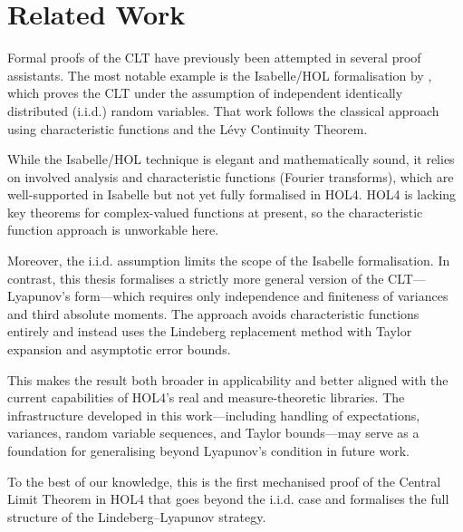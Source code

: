 \section{Related Work}

Formal proofs of the CLT have previously been attempted in several proof assistants. The most notable example is the Isabelle/HOL formalisation by \cite{serafin2015formally}, which proves the CLT under the assumption of independent identically distributed (i.i.d.) random variables. That work follows the classical approach using characteristic functions and the Lévy Continuity Theorem.

While the Isabelle/HOL technique is elegant and mathematically sound, it relies on involved analysis and characteristic functions (Fourier transforms), which are well-supported in Isabelle but not yet fully formalised in HOL4. HOL4 is lacking key theorems for complex-valued functions at present, so the characteristic function approach is unworkable here.

Moreover, the i.i.d. assumption limits the scope of the Isabelle formalisation. In contrast, this thesis formalises a strictly more general version of the CLT—Lyapunov’s form—which requires only independence and finiteness of variances and third absolute moments. The approach avoids characteristic functions entirely and instead uses the Lindeberg replacement method with Taylor expansion and asymptotic error bounds.

This makes the result both broader in applicability and better aligned with the current capabilities of HOL4’s real and measure-theoretic libraries. The infrastructure developed in this work—including handling of expectations, variances, random variable sequences, and Taylor bounds—may serve as a foundation for generalising beyond Lyapunov’s condition in future work.

To the best of our knowledge, this is the first mechanised proof of the Central Limit Theorem in HOL4 that goes beyond the i.i.d. case and formalises the full structure of the Lindeberg–Lyapunov strategy.

